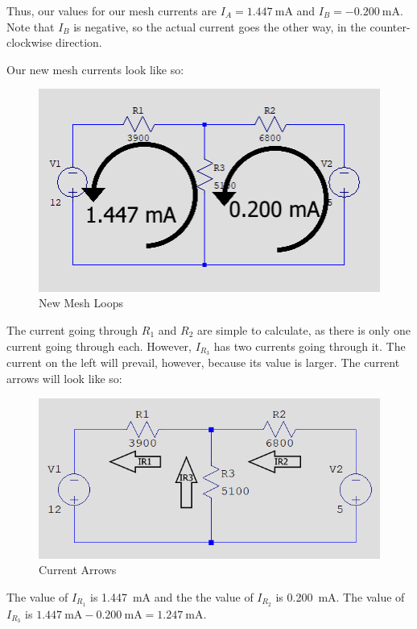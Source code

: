 \documentclass{article}
\begin{document}
Thus, our values for our mesh currents are
\(I_A = \SI{1.447}{\milli\ampere}\) and
\(I_B = \SI{-0.200}{\milli\ampere}\). Note that \(I_B\) is
negative, so the actual current goes the other way, in the
counter-clockwise direction.

\pagebreak

Our new mesh currents look like so:

\begin{figure}[h]
    \caption{New Mesh Loops}
    \centering
    \includegraphics{Images/MeshCurrent.png}
\end{figure}

The current going through \(R_1\) and \(R_2\) are simple to
calculate, as there is only one current going through each.
However, \(I_{R_3}\) has two currents going through it.
The current on the left will prevail, however, because its
value is larger. The current arrows will look like so:

\begin{figure}[h]
    \caption{Current Arrows}
    \centering
    \includegraphics[width=\textwidth]{Images/RealCurrent.png}
\end{figure}

The value of \(I_{R_1}\) is \SI{1.447}{\milli\ampere} and the
the value of \(I_{R_2}\) is \SI{0.200}{\milli\ampere}.
The value of \(I_{R_3}\) is \(\SI{1.447}{\milli\ampere}
-\SI{0.200}{\milli\ampere} = \SI{1.247}{\milli\ampere}\).
\end{document}
